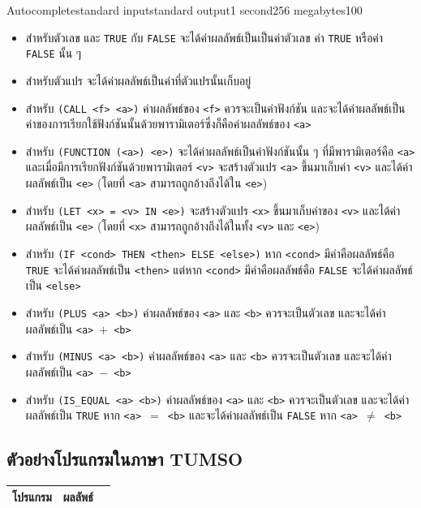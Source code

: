 \documentclass[11pt,a4paper]{article}
\begin{document}
\begin{problem}{Autocomplete}{standard input}{standard output}{1 second}{256 megabytes}{100}
  \begin{itemize}
    \item สำหรับตัวเลข และ \texttt{TRUE} กับ \texttt{FALSE} จะได้ค่าผลลัพธ์เป็นเป็นค่าตัวเลข ค่า \texttt{TRUE} หรือค่า \texttt{FALSE} นั้น ๆ
    \item สำหรับตัวแปร จะได้ค่าผลลัพธ์เป็นค่าที่ตัวแปรนั้นเก็บอยู่
    \item สำหรับ \texttt{(CALL <f> <a>)} ค่าผลลัพธ์ของ \texttt{<f>} ควรจะเป็นค่าฟังก์ชัน และจะได้ค่าผลลัพธ์เป็นค่าของการเรียกใช้ฟังก์ชันนั้นด้วยพารามิเตอร์ซึ่งก็คือค่าผลลัพธ์ของ \texttt{<a>}
    \item สำหรับ \texttt{(FUNCTION (<a>) <e>)} จะได้ค่าผลลัพธ์เป็นค่าฟังก์ชันนั้น ๆ ที่มีพารามิเตอร์คือ \texttt{<a>} และเมื่อมีการเรียกฟังก์ชันด้วยพารามิเตอร์ \texttt{<v>} จะสร้างตัวแปร \texttt{<a>} ขึ้นมาเก็บค่า \texttt{<v>} และได้ค่าผลลัพธ์เป็น \texttt{<e>} (โดยที่ \texttt{<a>} สามารถถูกอ้างถึงได้ใน \texttt{<e>})
    \item สำหรับ \texttt{(LET <x> = <v> IN <e>)} จะสร้างตัวแปร \texttt{<x>} ขึ้นมาเก็บค่าของ \texttt{<v>} และได้ค่าผลลัพธ์เป็น \texttt{<e>} (โดยที่ \texttt{<x>} สามารถถูกอ้างถึงได้ในทั้ง \texttt{<v>} และ \texttt{<e>})
    \item สำหรับ \texttt{(IF <cond> THEN <then> ELSE <else>)} หาก \texttt{<cond>} มีค่าคือผลลัพธ์คือ \texttt{TRUE} จะได้ค่าผลลัพธ์เป็น \texttt{<then>} แต่หาก \texttt{<cond>} มีค่าคือผลลัพธ์คือ \texttt{FALSE} จะได้ค่าผลลัพธ์เป็น \texttt{<else>}
    \item สำหรับ \texttt{(PLUS <a> <b>)} ค่าผลลัพธ์ของ \texttt{<a>} และ \texttt{<b>} ควรจะเป็นตัวเลข และจะได้ค่าผลลัพธ์เป็น \texttt{<a>}~$+$~\texttt{<b>}
    \item สำหรับ \texttt{(MINUS <a> <b>)} ค่าผลลัพธ์ของ \texttt{<a>} และ \texttt{<b>} ควรจะเป็นตัวเลข และจะได้ค่าผลลัพธ์เป็น \texttt{<a>}~$−$~\texttt{<b>}
    \item สำหรับ \texttt{(IS\_EQUAL <a> <b>)} ค่าผลลัพธ์ของ \texttt{<a>} และ \texttt{<b>} ควรจะเป็นตัวเลข และจะได้ค่าผลลัพธ์เป็น \texttt{TRUE} หาก \texttt{<a>}~$=$~\texttt{<b>} และจะได้ค่าผลลัพธ์เป็น \texttt{FALSE} หาก \texttt{<a>}~$\ne$~\texttt{<b>}
  \end{itemize}

  \subsection*{ตัวอย่างโปรแกรมในภาษา TUMSO}

  \begin{tabular}{|M{12cm}|M{3.5cm}|N}
    \hline
    \textbf{โปรแกรม} & \textbf{ผลลัพธ์} & \\[5pt]
    \hline \hline


\end{tabular}
\end{problem}
\end{document}
